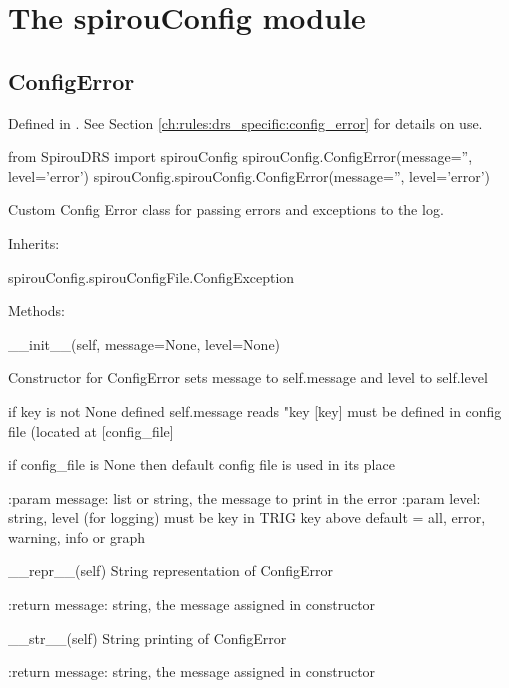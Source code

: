
\clearpage
\newpage
\noindent\begin{minipage}{\textwidth}
\section{The spirouConfig module}
\label{ch:the_module:spirouConfig}

\subsection{ConfigError}
\label{ch:the_module:spirouConfig:ConfigError}

Defined in \spirouConfig{}.
See Section \ref{ch:rules:drs_specific:config_error} for details on use.

\begin{pythonbox}
from SpirouDRS import spirouConfig
spirouConfig.ConfigError(message='', level='error')
spirouConfig.spirouConfig.ConfigError(message='', level='error')
\end{pythonbox}

\begin{pythondocstring}
Custom Config Error class for passing errors and exceptions to the log.

Inherits:

	spirouConfig.spirouConfigFile.ConfigException

Methods:

	__init__(self, message=None, level=None)

		Constructor for ConfigError sets message to self.message and level to
		self.level

		if key is not None defined self.message reads "key [key] must be
		defined in config file (located at [config_file]

		if config_file is None then default config file is used in its place

		:param message: list or string, the message to print in the error
		:param level: string, level (for logging) must be key in TRIG key above
		              default = all, error, warning, info or graph

	__repr__(self)
	    String representation of ConfigError
	    
	    :return message: string, the message assigned in constructor 

	__str__(self)
	    String printing of ConfigError

	    :return message: string, the message assigned in constructor

\end{pythondocstring}
\end{minipage}

